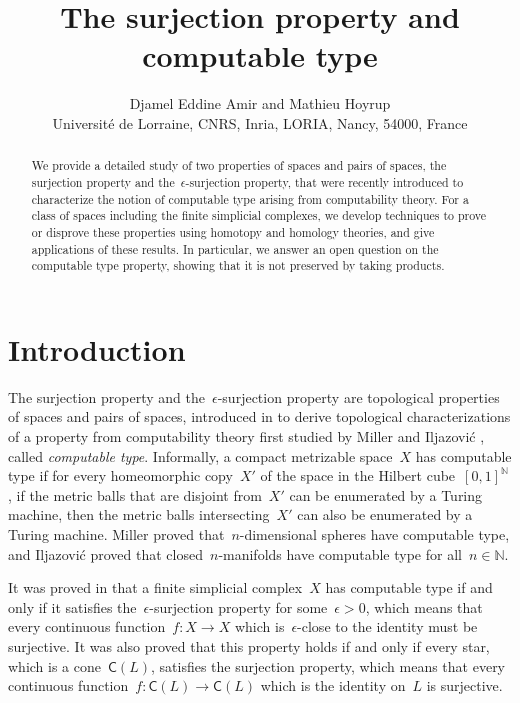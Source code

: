 \documentclass[english,11pt]{article}
\theoremstyle{plain}
\theoremstyle{remark}
\theoremstyle{definition}
\newcommand{\N}{\mathbb{N}}
\newcommand{\C}[1]{\mathsf{C}(#1)}%
\begin{document}
\title{The surjection property and computable type}

\author{Djamel Eddine Amir and Mathieu Hoyrup\\Universit\'e de Lorraine, CNRS, Inria, LORIA, Nancy, 54000, France}

\maketitle
\begin{abstract}
We provide a detailed study of two properties of spaces and pairs of spaces, the surjection property and the~$\epsilon$-surjection property, that were recently introduced to characterize the notion of computable type arising from computability theory. For a class of spaces including the finite simplicial complexes, we develop techniques to prove or disprove these properties using homotopy and homology theories, and give applications of these results. In particular, we answer an open question on the computable type property, showing that it is not preserved by taking products.
\end{abstract}


\section{Introduction}

The surjection property and the~$\epsilon$-surjection property are topological properties of spaces and pairs of spaces, introduced in \cite{AH22} to derive topological characterizations of a property from computability theory first studied by Miller \cite{Miller02} and Iljazovi\'c \cite{Iljazovic13}, called \emph{computable type}. Informally, a compact metrizable space~$X$ has computable type if for every homeomorphic copy~$X'$ of the space in the Hilbert cube~$[0,1]^\N$, if the metric balls that are disjoint from~$X'$ can be enumerated by a Turing machine, then the metric balls intersecting~$X'$ can also be enumerated by a Turing machine. Miller \cite{Miller02} proved that~$n$-dimensional spheres have computable type, and Iljazovi\'c \cite{Iljazovic13} proved that closed~$n$-manifolds have computable type for all~$n\in\N$.

It was proved in \cite{AH22} that a finite simplicial complex~$X$ has computable type if and only if it satisfies the~$\epsilon$-surjection property for some~$\epsilon>0$, which means that every continuous function~$f:X\to X$ which is~$\epsilon$-close to the identity must be surjective. It was also proved that this property holds if and only if every star, which is a cone~$\C{L}$, satisfies the surjection property, which means that every continuous function~$f:\C{L}\to\C{L}$ which is the identity on~$L$ is surjective.
\end{document}
